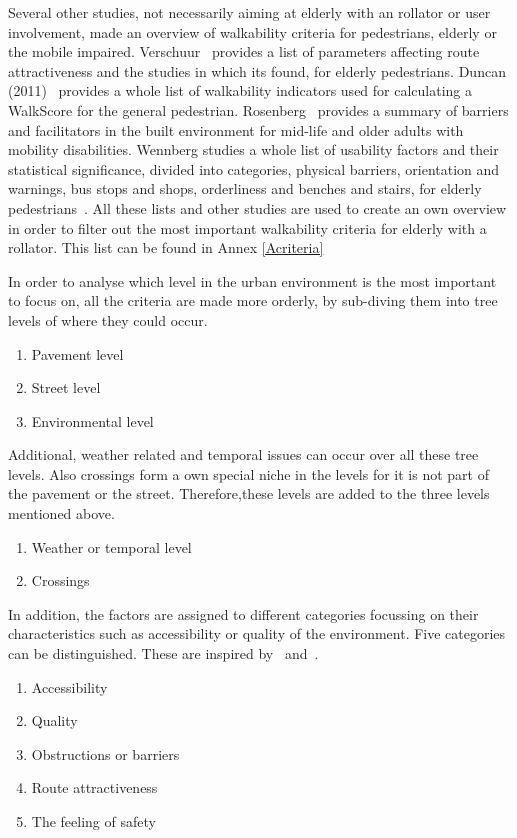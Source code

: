 Several other studies, not necessarily aiming at elderly with an rollator or user involvement, made an overview of walkability criteria for pedestrians, elderly or the mobile impaired. Verschuur~\cite{Verschuur2013} provides a list of parameters affecting route attractiveness and the studies in which its found, for elderly pedestrians. Duncan (2011)~\cite{Duncan2011} provides a whole list of walkability indicators used for calculating a WalkScore for the general pedestrian. Rosenberg~\cite{Rosenberg2012} provides a summary of barriers and facilitators in the built environment for mid-life and older adults with mobility disabilities. Wennberg studies a whole list of usability factors and their statistical significance, divided into categories, physical barriers, orientation and warnings, bus stops and shops, orderliness and benches and stairs, for elderly pedestrians~\cite{Wennberg2009}. All these lists and other studies are used to create an own overview in order to filter out the most important walkability criteria for elderly with a rollator. This list can be found in Annex \ref{Acriteria}

In order to analyse which level in the urban environment is the most important to focus on, all the criteria are made more orderly, by sub-diving them into tree levels of where they could occur. 

\begin{enumerate}
\item Pavement level
\item Street level
\item Environmental level
\end{enumerate}
Additional, weather related and temporal issues can occur over all these tree levels. Also crossings form a own special niche in the levels for it is not part of the pavement or the street. Therefore,these levels are added to the three levels mentioned above.
\begin{enumerate}
\item Weather or temporal level
\item Crossings
\end{enumerate}

In addition, the factors are assigned to different categories focussing on their characteristics such as accessibility or quality of the environment. Five categories can be distinguished. These are inspired by~\cite{Ballester2011} and~\cite{Rosenberg2012}.

\begin{enumerate}
\item Accessibility
\item Quality 
\item Obstructions or barriers
\item Route attractiveness 
\item The feeling of safety
\end{enumerate}

